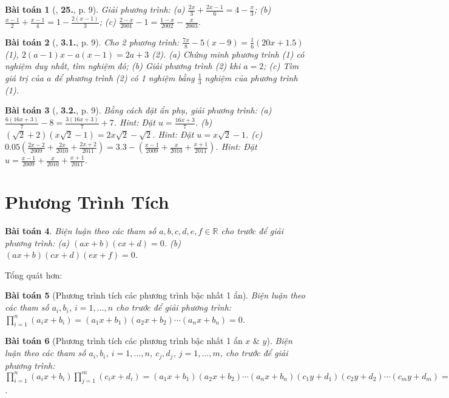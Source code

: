 \documentclass{article}
\numberwithin{equation}{section}
\newtheorem{baitoan}{Bài toán}
\begin{document}
\begin{baitoan}[\cite{SBT_Toan_8_tap_2}, \textbf{25.}, p. 9]
	Giải phương trình: (a) $\frac{2x}{3} + \frac{2x - 1}{6} = 4 - \frac{x}{3}$; (b) $\frac{x - 1}{2} + \frac{x - 1}{4} = 1 - \frac{2(x - 1)}{3}$; (c) $\frac{2 - x}{2001} - 1 = \frac{1 - x}{2002} - \frac{x}{2003}$.
\end{baitoan}

\begin{baitoan}[\cite{SBT_Toan_8_tap_2}, \textbf{3.1.}, p. 9]
	Cho 2 phương trình: $\frac{7x}{8} - 5(x - 9) = \frac{1}{6}(20x + 1.5)$ (1), $2(a - 1)x - a(x - 1) = 2a + 3$ (2). (a) Chứng minh phương trình (1) có nghiệm duy nhất, tìm nghiệm đó; (b) Giải phương trình (2) khi $a = 2$; (c) Tìm giá trị của $a$ để phương trình (2) có 1 nghiệm bằng $\frac{1}{3}$ nghiệm của phương trình (1).
\end{baitoan}

\begin{baitoan}[\cite{SBT_Toan_8_tap_2}, \textbf{3.2.}, p. 9]
	Bằng cách đặt ẩn phụ, giải phương trình: (a) $\frac{6(16x + 3)}{7} - 8 = \frac{3(16x + 3)}{7} + 7$. Hint: Đặt $u = \frac{16x + 3}{7}$. (b) $(\sqrt{2} + 2)(x\sqrt{2} - 1) = 2x\sqrt{2} - \sqrt{2}$. Hint: Đặt $u = x\sqrt{2} - 1$. (c) $0.05\left(\frac{2x - 2}{2009} + \frac{2x}{2010} + \frac{2x + 2}{2011}\right) = 3.3 - \left(\frac{x - 1}{2009} + \frac{x}{2010} + \frac{x + 1}{2011}\right)$. Hint: Đặt $u = \frac{x - 1}{2009} + \frac{x}{2010} + \frac{x + 1}{2011}$.
\end{baitoan}


\section{Phương Trình Tích}

\begin{baitoan}
	Biện luận theo các tham số $a,b,c,d,e,f\in\mathbb{R}$ cho trước để giải phương trình: (a) $(ax + b)(cx + d) = 0$. (b) $(ax + b)(cx + d)(ex + f) = 0$.
\end{baitoan}
Tổng quát hơn:
\begin{baitoan}[Phương trình tích các phương trình bậc nhất 1 ẩn]
	Biện luận theo các tham số $a_i,b_i$, $i = 1,\ldots,n$ cho trước để giải phương trình: $\prod_{i=1}^n (a_ix + b_i) = (a_1x + b_1)(a_2x + b_2)\cdots(a_nx + b_n) = 0$.
\end{baitoan}

\begin{baitoan}[Phương trình tích các phương trình bậc nhất 1 ẩn $x$ \& $y$]
	Biện luận theo các tham số $a_i,b_i$, $i = 1,\ldots,n$, $c_j,d_j$, $j = 1,\ldots,m$, cho trước để giải phương trình: $\prod_{i=1}^n (a_ix + b_i)\prod_{j=1}^m (c_ix + d_i) = (a_1x + b_1)(a_2x + b_2)\cdots(a_nx + b_n)(c_1y + d_1)(c_2y + d_2)\cdots(c_my + d_m) = 0$.
\end{baitoan}
\end{document}

